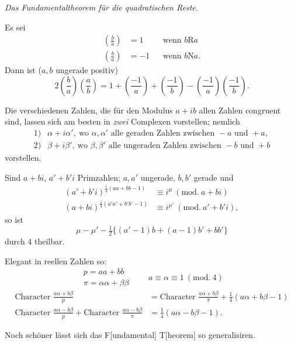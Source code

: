 \NoSourceHead
{}
\begin{center}\textit{Das Fundamentaltheorem für die quadratischen Reste.}\end{center}
\par\indent Es sei
\[
\begin{aligned}
\left(\frac ba\right)&=1&&\text{wenn }b\mathrm{R}a\\
\left(\frac ba\right)&=-1&&\text{wenn }b\mathrm{N}a.
\end{aligned}
\]
\noindent Dann ist ($a,b$ ungerade positiv)
\[
2\left(\frac ba\right)\left(\frac ab\right)=1+\left(\frac{-1}a\right)+\left(\frac{-1}b\right)-\left(\frac{-1}a\right)\left(\frac{-1}b\right).
\]
\par\indent Die verschiedenen Zahlen, die für den Modulus $a+ib$ allen Zahlen congruent sind, lassen sich am besten in \textit{zwei} Complexen vorstellen; nemlich
\[
\begin{array}{rl}
1)&\alpha+i\alpha',\ \text{wo }\alpha,\alpha'\text{ alle geraden Zahlen zwischen }-a\text{ und }+a,\\
2)&\beta+i\beta',\ \text{wo }\beta,\beta'\text{ alle ungeraden Zahlen zwischen }-b\text{ und }+b
\end{array}
\]
\noindent vorstellen.
\clearpage

\par\indent Sind $a+bi$, $a'+b'i$ Primzahlen; $a,a'$ ungerade, $b,b'$ gerade und
\[
\begin{aligned}
(a'+b'i)^{\tfrac14(aa+bb-1)}&\equiv i^\mu\ (\mathrm{mod.}\ a+bi)\\
(a+bi)^{\tfrac14(a'a'+b'b'-1)}&\equiv i^{\mu'}\ (\mathrm{mod.}\ a'+b'i),
\end{aligned}
\]
\noindent so ist
\[
\mu-\mu'-\tfrac12\{(a'-1)b+(a-1)b'+bb'\}
\]
\noindent durch $4$ theilbar.

Elegant in reellen Zahlen so:
\[
\begin{gathered}p=aa+bb\\\pi=\alpha\alpha+\beta\beta\end{gathered}
\qquad a\equiv\alpha\equiv1\ (\mathrm{mod.}\ 4)
\]
\[
\begin{aligned}
\text{Character }\frac{a\alpha+b\beta}{p}&=\text{Character }\frac{a\alpha+b\beta}{\pi}+\tfrac14(a\alpha+b\beta-1)\\
\text{Character }\frac{a\alpha-b\beta}{p}+\text{Character }\frac{a\alpha-b\beta}{\pi}&=\tfrac14(a\alpha-b\beta-1).
\end{aligned}
\]
\par\indent Noch schöner lässt sich das F[undamental] T[heorem] so generalisiren.

